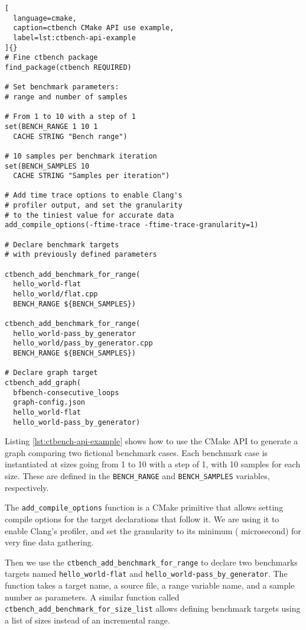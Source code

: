 \documentclass[../main]{subfiles}
\begin{document}
\begin{lstlisting}[
  language=cmake,
  caption=ctbench CMake API use example,
  label=lst:ctbench-api-example
]{}
# Fine ctbench package
find_package(ctbench REQUIRED)

# Set benchmark parameters:
# range and number of samples

# From 1 to 10 with a step of 1
set(BENCH_RANGE 1 10 1
  CACHE STRING "Bench range")

# 10 samples per benchmark iteration
set(BENCH_SAMPLES 10
  CACHE STRING "Samples per iteration")

# Add time trace options to enable Clang's
# profiler output, and set the granularity
# to the tiniest value for accurate data
add_compile_options(-ftime-trace -ftime-trace-granularity=1)

# Declare benchmark targets
# with previously defined parameters

ctbench_add_benchmark_for_range(
  hello_world-flat
  hello_world/flat.cpp
  BENCH_RANGE ${BENCH_SAMPLES})

ctbench_add_benchmark_for_range(
  hello_world-pass_by_generator
  hello_world/pass_by_generator.cpp
  BENCH_RANGE ${BENCH_SAMPLES})

# Declare graph target
ctbench_add_graph(
  bfbench-consecutive_loops
  graph-config.json
  hello_world-flat
  hello_world-pass_by_generator)
\end{lstlisting}

Listing \ref{lst:ctbench-api-example} shows how to use the CMake API to generate
a graph comparing two fictional benchmark cases. Each benchmark case is
instantiated at sizes going from 1 to 10 with a step of 1, with 10 samples for
each size. These are defined in the \lstinline{BENCH_RANGE} and
\lstinline{BENCH_SAMPLES} variables, respectively.

The \lstinline{add_compile_options} function is a CMake primitive that allows
setting compile options for the target declarations that follow it. We are using
it to enable Clang's profiler, and set the granularity to its minimum (
microsecond) for very fine data gathering.

Then we use the \lstinline{ctbench_add_benchmark_for_range} to declare two
benchmarks targets named \lstinline{hello_world-flat} and
\lstinline{hello_world-pass_by_generator}. The function takes a target name, a
\cpp source file, a range variable name, and a sample number as parameters.
A similar function called \lstinline{ctbench_add_benchmark_for_size_list} allows
defining benchmark targets using a list of sizes instead of an incremental
range.
\end{document}
